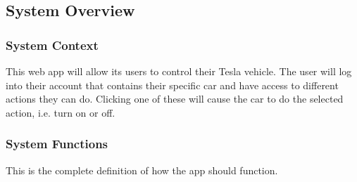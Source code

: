 \documentclass[onecolumn, draftclsnofoot,10pt, compsoc]{IEEEtran}
\begin{document}
\subsection{System Overview}
\subsubsection{System Context}
This web app will allow its users to control their Tesla vehicle. The user will log into their account that contains their specific car and have access to different actions they can do. Clicking one of these will cause the car to do the selected action, i.e. turn on or off.
\subsubsection{System Functions} \label{sssec:functions}
This is the complete definition of how the app should function.
\end{document}
